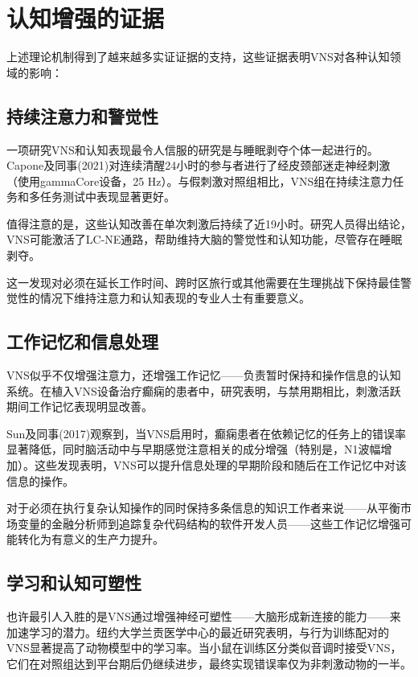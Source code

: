 \documentclass[
  Letterpaper,
]{scrbook}
\begin{document}
\section{认知增强的证据}\label{ux8ba4ux77e5ux589eux5f3aux7684ux8bc1ux636e}

上述理论机制得到了越来越多实证证据的支持，这些证据表明VNS对各种认知领域的影响：

\subsection{持续注意力和警觉性}\label{ux6301ux7eedux6ce8ux610fux529bux548cux8b66ux89c9ux6027}

一项研究VNS和认知表现最令人信服的研究是与睡眠剥夺个体一起进行的。Capone及同事(2021)对连续清醒24小时的参与者进行了经皮颈部迷走神经刺激（使用gammaCore设备，25
Hz）。与假刺激对照组相比，VNS组在持续注意力任务和多任务测试中表现显著更好。

值得注意的是，这些认知改善在单次刺激后持续了近19小时。研究人员得出结论，VNS可能激活了LC-NE通路，帮助维持大脑的警觉性和认知功能，尽管存在睡眠剥夺。

这一发现对必须在延长工作时间、跨时区旅行或其他需要在生理挑战下保持最佳警觉性的情况下维持注意力和认知表现的专业人士有重要意义。

\subsection{工作记忆和信息处理}\label{ux5de5ux4f5cux8bb0ux5fc6ux548cux4fe1ux606fux5904ux7406}

VNS似乎不仅增强注意力，还增强工作记忆------负责暂时保持和操作信息的认知系统。在植入VNS设备治疗癫痫的患者中，研究表明，与禁用期相比，刺激活跃期间工作记忆表现明显改善。

Sun及同事(2017)观察到，当VNS启用时，癫痫患者在依赖记忆的任务上的错误率显著降低，同时脑活动中与早期感觉注意相关的成分增强（特别是，N1波幅增加）。这些发现表明，VNS可以提升信息处理的早期阶段和随后在工作记忆中对该信息的操作。

对于必须在执行复杂认知操作的同时保持多条信息的知识工作者来说------从平衡市场变量的金融分析师到追踪复杂代码结构的软件开发人员------这些工作记忆增强可能转化为有意义的生产力提升。

\subsection{学习和认知可塑性}\label{ux5b66ux4e60ux548cux8ba4ux77e5ux53efux5851ux6027}

也许最引人入胜的是VNS通过增强神经可塑性------大脑形成新连接的能力------来加速学习的潜力。纽约大学兰贡医学中心的最近研究表明，与行为训练配对的VNS显著提高了动物模型中的学习率。当小鼠在训练区分类似音调时接受VNS，它们在对照组达到平台期后仍继续进步，最终实现错误率仅为非刺激动物的一半。
\end{document}
